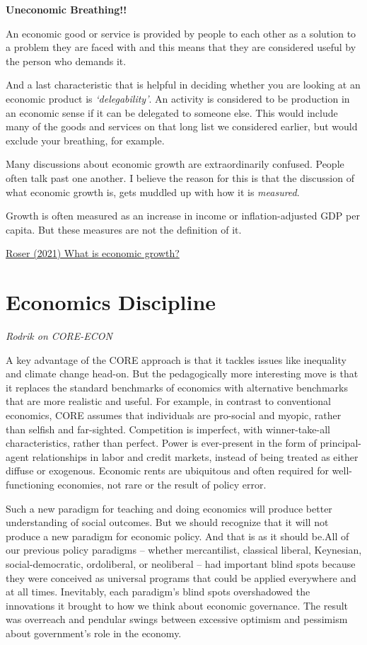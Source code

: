\documentclass[
]{book}
\begin{document}
\textbf{Uneconomic Breathing!!}

An economic good or service is provided by people to each other as a solution to a problem they are faced with and this means that they are considered useful by the person who demands it.

And a last characteristic that is helpful in deciding whether you are looking at an economic product is \emph{`delegability'}.
An activity is considered to be production in an economic sense if it can be delegated to someone else.
This would include many of the goods and services on that long list we considered earlier, but would exclude your breathing, for example.

Many discussions about economic growth are extraordinarily confused. People often talk past one another. I believe the reason for this is that the discussion of what economic growth is, gets muddled up with how it is \emph{measured}.

Growth is often measured as an increase in income or inflation-adjusted GDP per capita. But these measures are not the definition of it.

\href{https://ourworldindata.org/what-is-economic-growth}{Roser (2021) What is economic growth?}

\hypertarget{economics-discipline}{%
\section{Economics Discipline}\label{economics-discipline}}

\emph{Rodrik on CORE-ECON}

A key advantage of the CORE approach is that it tackles issues like inequality and climate change head-on. But the pedagogically more interesting move is that it replaces the standard benchmarks of economics with alternative benchmarks that are more realistic and useful. For example, in contrast to conventional economics, CORE assumes that individuals are pro-social and myopic, rather than selfish and far-sighted. Competition is imperfect, with winner-take-all characteristics, rather than perfect. Power is ever-present in the form of principal-agent relationships in labor and credit markets, instead of being treated as either diffuse or exogenous. Economic rents are ubiquitous and often required for well-functioning economies, not rare or the result of policy error.

Such a new paradigm for teaching and doing economics will produce better understanding of social outcomes. But we should recognize that it will not produce a new paradigm for economic policy. And that is as it should be.All of our previous policy paradigms -- whether mercantilist, classical liberal, Keynesian, social-democratic, ordoliberal, or neoliberal -- had important blind spots because they were conceived as universal programs that could be applied everywhere and at all times. Inevitably, each paradigm's blind spots overshadowed the innovations it brought to how we think about economic governance. The result was overreach and pendular swings between excessive optimism and pessimism about government's role in the economy.
\end{document}
